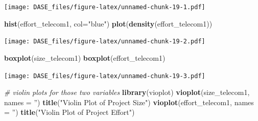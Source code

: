 \documentclass[]{book}
\newenvironment{Shaded}{\begin{snugshade}}{\end{snugshade}}
\newcommand{\KeywordTok}[1]{\textcolor[rgb]{0.13,0.29,0.53}{\textbf{{#1}}}}
\newcommand{\DataTypeTok}[1]{\textcolor[rgb]{0.13,0.29,0.53}{{#1}}}
\newcommand{\DecValTok}[1]{\textcolor[rgb]{0.00,0.00,0.81}{{#1}}}
\newcommand{\StringTok}[1]{\textcolor[rgb]{0.31,0.60,0.02}{{#1}}}
\newcommand{\CommentTok}[1]{\textcolor[rgb]{0.56,0.35,0.01}{\textit{{#1}}}}
\newcommand{\NormalTok}[1]{{#1}}
\begin{document}
\begin{Shaded}
\end{Shaded}

\texttt{[image: DASE\_files/figure-latex/unnamed-chunk-19-1.pdf]}

\begin{Shaded}
\begin{Highlighting}[]
\KeywordTok{hist}\NormalTok{(effort_telecom1, }\DataTypeTok{col=}\StringTok{"blue"}\NormalTok{)}
\KeywordTok{plot}\NormalTok{(}\KeywordTok{density}\NormalTok{(effort_telecom1))}
\end{Highlighting}
\end{Shaded}

\texttt{[image: DASE\_files/figure-latex/unnamed-chunk-19-2.pdf]}

\begin{Shaded}
\begin{Highlighting}[]
\KeywordTok{boxplot}\NormalTok{(size_telecom1)}
\KeywordTok{boxplot}\NormalTok{(effort_telecom1)}
\end{Highlighting}
\end{Shaded}

\texttt{[image: DASE\_files/figure-latex/unnamed-chunk-19-3.pdf]}

\begin{Shaded}
\begin{Highlighting}[]
\CommentTok{# violin plots for those two variables}
\KeywordTok{library}\NormalTok{(vioplot)}
\KeywordTok{vioplot}\NormalTok{(size_telecom1, }\DataTypeTok{names =} \StringTok{''}\NormalTok{) }
\KeywordTok{title}\NormalTok{(}\StringTok{"Violin Plot of Project Size"}\NormalTok{)}
\KeywordTok{vioplot}\NormalTok{(effort_telecom1, }\DataTypeTok{names =} \StringTok{''}\NormalTok{)}
\KeywordTok{title}\NormalTok{(}\StringTok{"Violin Plot of Project Effort"}\NormalTok{)}
\end{Highlighting}
\end{Shaded}
\end{document}
